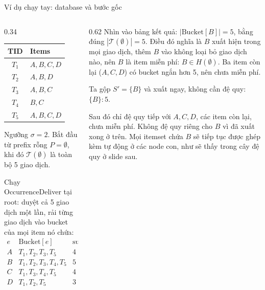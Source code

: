 \documentclass[9pt, aspectratio=169]{beamer}
\begin{document}
\begin{frame}{Ví dụ chạy tay: database và bước gốc}
  \begin{columns}[T,onlytextwidth]
    \begin{column}{0.34\textwidth}
      \begin{tabular}{@{}cl@{}}
        \toprule
        TID & Items \\
        \midrule
        $T_1$ & $A,B,C,D$ \\
        $T_2$ & $A,B,D$ \\
        $T_3$ & $A,B,C$ \\
        $T_4$ & $B,C$ \\
        $T_5$ & $A,B,C,D$ \\
        \bottomrule
      \end{tabular}

      \vspace{0.2cm}
      \small Ngưỡng $\sigma=2$. Bắt đầu từ prefix rỗng $P=\emptyset$, khi đó
      $\mathcal T(\emptyset)$ là toàn bộ 5 giao dịch.

      \vspace{0.2cm}
      Chạy OccurrenceDeliver tại root: duyệt cả 5 giao dịch một lần, rải
      từng giao dịch vào bucket của mọi item nó chứa:
      \[
      \begin{array}{c|c|c}
      e & \mathrm{Bucket}[e] & \mathrm{sup}\\ \hline
      A & T_1,T_2,T_3,T_5 & 4\\
      B & T_1,T_2,T_3,T_4,T_5 & 5\\
      C & T_1,T_3,T_4,T_5 & 4\\
      D & T_1,T_2,T_5 & 3
      \end{array}
      \]
    \end{column}

    \begin{column}{0.62\textwidth}
      \small
      Nhìn vào bảng kết quả: $|\mathrm{Bucket}[B]|=5$, bằng đúng
      $|\mathcal T(\emptyset)|=5$. Điều đó nghĩa là $B$ xuất hiện trong mọi
      giao dịch, thêm $B$ vào không loại bỏ giao dịch nào, nên $B$ là item
      miễn phí: $B\in H(\emptyset)$. Ba item còn lại ($A,C,D$) có bucket
      ngắn hơn 5, nên chưa miễn phí.

      \vspace{0.2cm}
      Ta gộp $S'=\{B\}$ và xuất ngay, không cần đệ quy: $\{B\}:5$.

      \vspace{0.2cm}
      Sau đó chỉ đệ quy tiếp với $A,C,D$, các item còn lại, chưa miễn phí.
      Không đệ quy riêng cho $B$ vì đã xuất xong ở trên. Mọi itemset chứa
      $B$ sẽ tiếp tục được ghép kèm tự động ở các node con, như sẽ thấy
      trong cây đệ quy ở slide sau.
    \end{column}
  \end{columns}
\end{frame}
\end{document}
